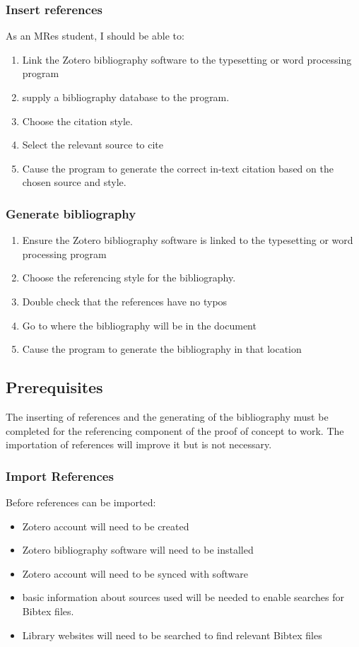 \documentclass{article}
\begin{document}
\subsubsection*{Insert references}

As an MRes student, I should be able to: 
\begin{enumerate} 
\item Link the Zotero bibliography software to the typesetting or word processing program
\item supply a bibliography database to the program. 
\item Choose the citation style.
\item Select the relevant source to cite
\item Cause the program to generate the correct in-text citation based on the chosen source and style.
\end{enumerate} 

\subsubsection*{Generate bibliography}
\begin{enumerate} 
\item Ensure the Zotero bibliography software is linked to the typesetting or word processing program
\item Choose the referencing style for the bibliography.
\item Double check that the references have no typos
\item Go to where the bibliography will be in the document
\item Cause the program to generate the bibliography in that location
\end{enumerate} 


\subsection*{Prerequisites}

The inserting of references and the generating of the bibliography must be completed for the referencing component of the proof of concept to work. The importation of references will improve it but is not necessary.

\subsubsection*{Import References}

Before references can be imported:
\begin{itemize}
\item Zotero account will need to be created
    \item Zotero bibliography software will need to be installed
    \item Zotero account will need to be synced with software
    \item basic information about sources used will be needed to enable searches for Bibtex files.
    \item Library websites will need to be searched to find relevant Bibtex files
\end{itemize}
\end{document}
